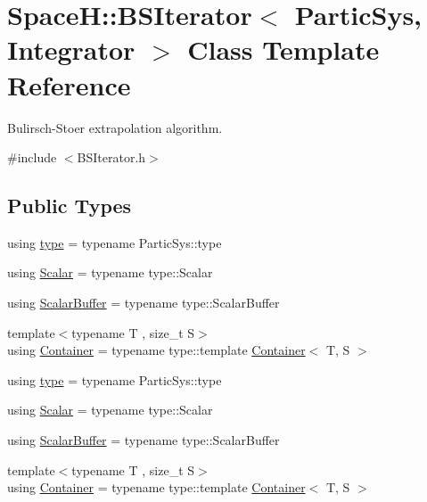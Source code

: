\hypertarget{class_space_h_1_1_b_s_iterator}{}\section{SpaceH\+:\+:B\+S\+Iterator$<$ Partic\+Sys, Integrator $>$ Class Template Reference}
\label{class_space_h_1_1_b_s_iterator}


Bulirsch-\/\+Stoer extrapolation algorithm.  




{\ttfamily \#include $<$B\+S\+Iterator.\+h$>$}

\subsection*{Public Types}
\begin{DoxyCompactItemize}
\item 
using \mbox{\hyperlink{class_space_h_1_1_b_s_iterator_a659e97efd0fe41f3993663d0ec9b75e7}{type}} = typename Partic\+Sys\+::type
\item 
using \mbox{\hyperlink{class_space_h_1_1_b_s_iterator_a89993409583b3022709bdfd84ea8149d}{Scalar}} = typename type\+::\+Scalar
\item 
using \mbox{\hyperlink{class_space_h_1_1_b_s_iterator_a3c3609d40e0ac4268760adeb1f0514de}{Scalar\+Buffer}} = typename type\+::\+Scalar\+Buffer
\item 
{\footnotesize template$<$typename T , size\+\_\+t S$>$ }\\using \mbox{\hyperlink{class_space_h_1_1_b_s_iterator_a6f704f5db07202710306e6e334c99e2f}{Container}} = typename type\+::template \mbox{\hyperlink{class_space_h_1_1_b_s_iterator_a6f704f5db07202710306e6e334c99e2f}{Container}}$<$ T, S $>$
\item 
using \mbox{\hyperlink{class_space_h_1_1_b_s_iterator_a659e97efd0fe41f3993663d0ec9b75e7}{type}} = typename Partic\+Sys\+::type
\item 
using \mbox{\hyperlink{class_space_h_1_1_b_s_iterator_a89993409583b3022709bdfd84ea8149d}{Scalar}} = typename type\+::\+Scalar
\item 
using \mbox{\hyperlink{class_space_h_1_1_b_s_iterator_a3c3609d40e0ac4268760adeb1f0514de}{Scalar\+Buffer}} = typename type\+::\+Scalar\+Buffer
\item 
{\footnotesize template$<$typename T , size\+\_\+t S$>$ }\\using \mbox{\hyperlink{class_space_h_1_1_b_s_iterator_a6f704f5db07202710306e6e334c99e2f}{Container}} = typename type\+::template \mbox{\hyperlink{class_space_h_1_1_b_s_iterator_a6f704f5db07202710306e6e334c99e2f}{Container}}$<$ T, S $>$
\end{DoxyCompactItemize}
